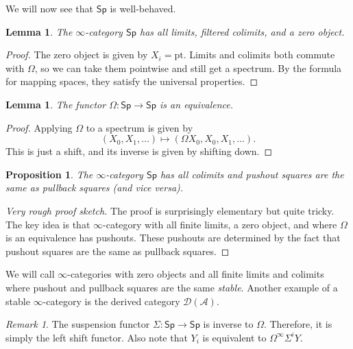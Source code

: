 \documentclass[10pt]{amsart}
\newtheorem{prop}[thm]{Proposition}
\newtheorem{lem}[thm]{Lemma}
\theoremstyle{definition}
\theoremstyle{remark}
\newtheorem{rmk}[thm]{Remark}
\theoremstyle{plain}
\theoremstyle{definition}
\theoremstyle{remark}
\newcommand{\mc}[1]{\mathcal{#1}}
\newcommand{\mr}[1]{\mathrm{#1}}
\newcommand{\ms}[1]{\mathsf{#1}}
\newcommand{\1}{\mathbf{1}}
\newcommand{\2}{\mathbf{2}}
\newcommand{\3}{\mathbf{3}}
\newcommand{\pt}{\mr{pt}}
\begin{document}
We will now see that $\ms{Sp}$ is well-behaved.

\begin{lem}
    The $\infty$-category $\ms{Sp}$ has all limits, filtered colimits, and a zero object.
\end{lem}

\begin{proof}
    The zero object is given by $X_i = \pt$. Limits and colimits both commute with $\Omega$, so we can take them pointwise and still get a spectrum. By the formula for mapping spaces, they satisfy the universal properties.
\end{proof}

\begin{lem}
    The functor $\Omega \colon \ms{Sp} \to \ms{Sp}$ is an equivalence.
\end{lem}

\begin{proof}
    Applying $\Omega$ to a spectrum is given by
    \[ (X_0, X_1, \ldots) \mapsto (\Omega X_0, X_0, X_1, \ldots). \]
    This is just a shift, and its inverse is given by shifting down.
\end{proof}

\begin{prop}
    The $\infty$-category $\ms{Sp}$ has all colimits and pushout squares are the same as pullback squares (and vice versa).
\end{prop}


\begin{proof}[Very rough proof sketch]
    The proof is surprisingly elementary but quite tricky. The key idea is that $\infty$-category with all finite limits, a zero object, and where $\Omega$ is an equivalence has pushouts. These pushouts are determined by the fact that pushout squares are the same as pullback squares.
\end{proof}

We will call $\infty$-categories with zero objects and all finite limits and colimits where pushout and pullback squares are the same \textit{stable}. Another example of a stable $\infty$-category is the derived category $\mc{D}(\mc{A})$.

\begin{rmk}
    The suspension functor $\Sigma \colon \ms{Sp} \to \ms{Sp}$ is inverse to $\Omega$. Therefore, it is simply the left shift functor. Also note that $Y_i$ is equivalent to $\Omega^{\infty} \Sigma^i Y$.
\end{rmk}
\end{document}
